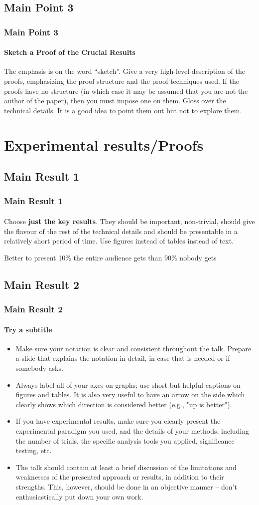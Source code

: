 \documentclass[11pt]{beamer}              %
\begin{document}
\subsection{Main Point 3}
\begin{frame}
\frametitle{Main Point 3}
\framesubtitle{Sketch a Proof of the Crucial Results}
The emphasis is on the word ``sketch''. Give a very high-level description of the proofs, emphasizing the proof structure and the proof techniques used. If the proofs have no structure (in which case it may be assumed that you are not the author of the paper), then you must impose one on them. Gloss over the technical details. It is a good idea to point them out but not to explore them.
\end{frame}


\section{Experimental results/Proofs}

\subsection{Main Result 1}
\begin{frame}
\frametitle{Main Result 1}
\framesubtitle{}
Choose \textbf{just the key results}. They should be important, non-trivial, should give the flavour of the rest of the technical details and should be presentable in a relatively short period of time. Use figures instead of tables instead of text.

Better to present 10\% the entire audience gets than 90\% nobody gets
\end{frame}


\subsection{Main Result 2}
\begin{frame}
\frametitle{Main Result 2}
\framesubtitle{Try a subtitle}
\begin{itemize}
\item Make sure your notation is clear and consistent throughout the talk. Prepare a slide that explains the notation in detail, in case that is needed or if somebody asks.
\item Always label all of your axes on graphs; use short but helpful captions on figures and tables. It is also very useful to have an arrow on the side which clearly shows which direction is considered better (e.g., "up is better").
\item If you have experimental results, make sure you clearly present the experimental paradigm you used, and the details of your methods, including the number of trials, the specific analysis tools you applied, significance testing, etc.
\item The talk should contain at least a brief discussion of the limitations and weaknesses of the presented approach or results, in addition to their strengths. This, however, should be done in an objective manner -- don't enthusiastically put down your own work.
\end{itemize}
\end{frame}
\end{document}
